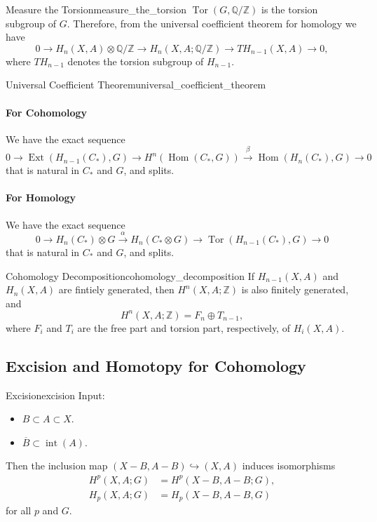 \documentclass{article}
\begin{document}
\begin{example}{Measure the Torsion}{measure_the_torsion}
    $\operatorname{Tor}(G,\mathbb{Q}/\mathbb{Z})$ is the torsion subgroup of $G$.
    Therefore, from the universal coefficient theorem for homology we have
    \[ 0\rightarrow H_n(X,A) \otimes \mathbb{Q}/\mathbb{Z} \rightarrow H_n(X,A;\mathbb{Q}/\mathbb{Z}) \rightarrow TH_{n-1}(X,A) \rightarrow 0, \]
    where $TH_{n-1}$ denotes the torsion subgroup of $H_{n-1}$.
\end{example}

\begin{theorem}{Universal Coefficient Theorem}{universal_coefficient_theorem}
    \paragraph*{For Cohomology}
    We have the exact sequence
    \[ 0 \rightarrow \operatorname{Ext}(H_{n-1}(C_*),G) \rightarrow H^n(\operatorname{Hom}(C_*,G)) \xrightarrow{\beta} \operatorname{Hom}(H_n(C_*),G) \rightarrow 0 \]
    that is natural in $C_*$ and $G$, and splits.
    \paragraph*{For Homology}
    We have the exact sequence
    \[ 0 \rightarrow H_n(C_*) \otimes G \xrightarrow{\alpha} H_n(C_*\otimes G) \rightarrow \operatorname{Tor}(H_{n-1}(C_*), G) \rightarrow 0 \]
    that is natural in $C_*$ and $G$, and splits.
\end{theorem}

\begin{corollary}{Cohomology Decomposition}{cohomology_decomposition}
    If $H_{n-1}(X,A)$ and $H_n(X,A)$ are fintiely generated, then $H^n(X,A;\mathbb{Z})$ is also finitely generated, and
    \[ H^n(X,A;\mathbb{Z}) = F_n \oplus T_{n-1}, \]
    where $F_i$ and $T_i$ are the free part and torsion part, respectively, of $H_i(X,A)$.
\end{corollary}

\subsection{Excision and Homotopy for Cohomology}

\begin{theorem}{Excision}{excision}
    Input:
    \begin{itemize}
        \item $B\subset A\subset X$.
        \item $\overline{B}\subset \operatorname{int}(A)$.
    \end{itemize}
    Then the inclusion map $(X-B,A-B) \hookrightarrow (X,A)$ induces isomorphisms
    \begin{align*}
        H^p(X,A;G) &= H^p(X-B,A-B; G),\\
        H_p(X,A;G) &= H_p(X-B,A-B,G)
    \end{align*}
    for all $p$ and $G$.
\end{theorem}
\end{document}

